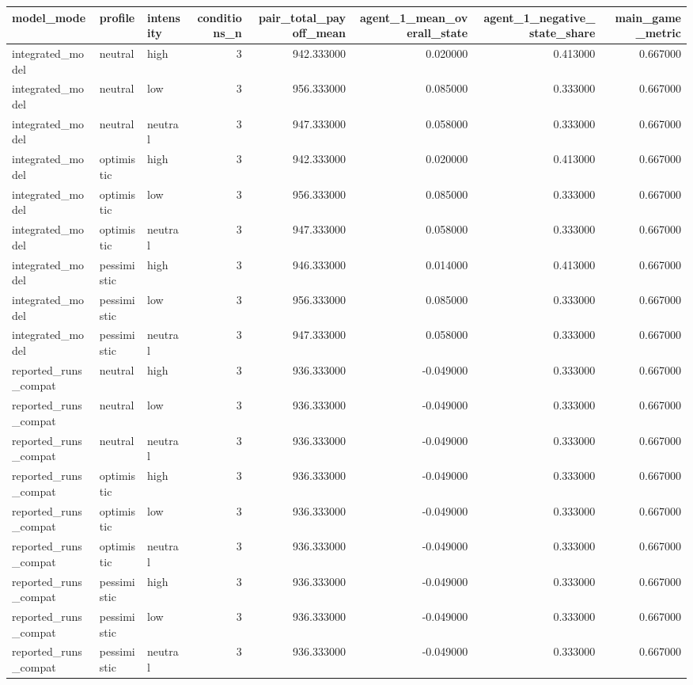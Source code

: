 \begin{tabular}{lllrrrrr}
\toprule
model\_mode & profile & intensity & conditions\_n & pair\_total\_payoff\_mean & agent\_1\_mean\_overall\_state & agent\_1\_negative\_state\_share & main\_game\_metric \\
\midrule
integrated\_model & neutral & high & 3 & 942.333000 & 0.020000 & 0.413000 & 0.667000 \\
integrated\_model & neutral & low & 3 & 956.333000 & 0.085000 & 0.333000 & 0.667000 \\
integrated\_model & neutral & neutral & 3 & 947.333000 & 0.058000 & 0.333000 & 0.667000 \\
integrated\_model & optimistic & high & 3 & 942.333000 & 0.020000 & 0.413000 & 0.667000 \\
integrated\_model & optimistic & low & 3 & 956.333000 & 0.085000 & 0.333000 & 0.667000 \\
integrated\_model & optimistic & neutral & 3 & 947.333000 & 0.058000 & 0.333000 & 0.667000 \\
integrated\_model & pessimistic & high & 3 & 946.333000 & 0.014000 & 0.413000 & 0.667000 \\
integrated\_model & pessimistic & low & 3 & 956.333000 & 0.085000 & 0.333000 & 0.667000 \\
integrated\_model & pessimistic & neutral & 3 & 947.333000 & 0.058000 & 0.333000 & 0.667000 \\
reported\_runs\_compat & neutral & high & 3 & 936.333000 & -0.049000 & 0.333000 & 0.667000 \\
reported\_runs\_compat & neutral & low & 3 & 936.333000 & -0.049000 & 0.333000 & 0.667000 \\
reported\_runs\_compat & neutral & neutral & 3 & 936.333000 & -0.049000 & 0.333000 & 0.667000 \\
reported\_runs\_compat & optimistic & high & 3 & 936.333000 & -0.049000 & 0.333000 & 0.667000 \\
reported\_runs\_compat & optimistic & low & 3 & 936.333000 & -0.049000 & 0.333000 & 0.667000 \\
reported\_runs\_compat & optimistic & neutral & 3 & 936.333000 & -0.049000 & 0.333000 & 0.667000 \\
reported\_runs\_compat & pessimistic & high & 3 & 936.333000 & -0.049000 & 0.333000 & 0.667000 \\
reported\_runs\_compat & pessimistic & low & 3 & 936.333000 & -0.049000 & 0.333000 & 0.667000 \\
reported\_runs\_compat & pessimistic & neutral & 3 & 936.333000 & -0.049000 & 0.333000 & 0.667000 \\
\bottomrule
\end{tabular}
